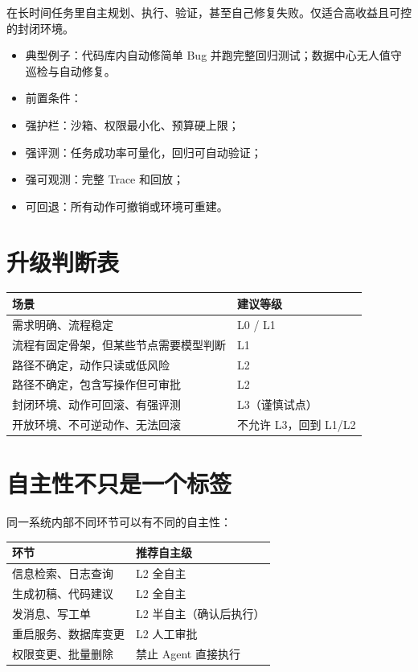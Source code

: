 \documentclass[9pt,a4paper,twocolumn]{ctexart}
\begin{document}
在长时间任务里自主规划、执行、验证，甚至自己修复失败。仅适合高收益且可控的封闭环境。


\begin{itemize}[itemsep=1pt, topsep=2pt]
  \item 典型例子：代码库内自动修简单 Bug 并跑完整回归测试；数据中心无人值守巡检与自动修复。
  \item 前置条件：
  \item 强护栏：沙箱、权限最小化、预算硬上限；
  \item 强评测：任务成功率可量化，回归可自动验证；
  \item 强可观测：完整 Trace 和回放；
  \item 可回退：所有动作可撤销或环境可重建。
\end{itemize}


\section*{升级判断表}

{\footnotesize
\begin{tabular}{|p{}|p{}|}
\hline
\textbf{场景} & \textbf{建议等级} \\
\hline
需求明确、流程稳定 & L0 / L1 \\
\hline
流程有固定骨架，但某些节点需要模型判断 & L1 \\
\hline
路径不确定，动作只读或低风险 & L2 \\
\hline
路径不确定，包含写操作但可审批 & L2 \\
\hline
封闭环境、动作可回滚、有强评测 & L3（谨慎试点） \\
\hline
开放环境、不可逆动作、无法回滚 & 不允许 L3，回到 L1/L2 \\
\hline
\end{tabular}
}



\section*{自主性不只是一个标签}


同一系统内部不同环节可以有不同的自主性：


{\footnotesize
\begin{tabular}{|p{}|p{}|}
\hline
\textbf{环节} & \textbf{推荐自主级} \\
\hline
信息检索、日志查询 & L2 全自主 \\
\hline
生成初稿、代码建议 & L2 全自主 \\
\hline
发消息、写工单 & L2 半自主（确认后执行） \\
\hline
重启服务、数据库变更 & L2 人工审批 \\
\hline
权限变更、批量删除 & 禁止 Agent 直接执行 \\
\hline
\end{tabular}
}
\end{document}
